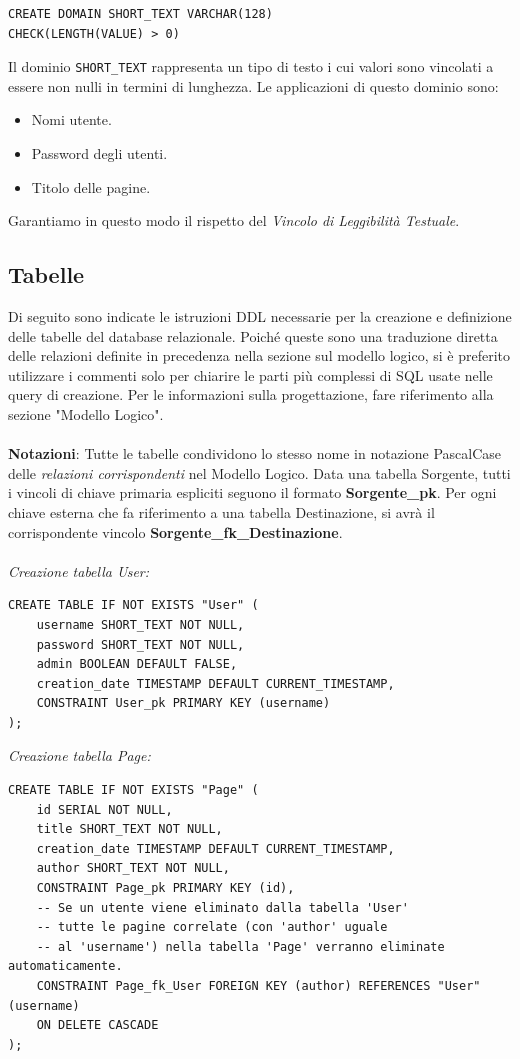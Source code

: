 \documentclass{article}
\begin{document}
	\begin{lstlisting}[style=SQL]
CREATE DOMAIN SHORT_TEXT VARCHAR(128)
CHECK(LENGTH(VALUE) > 0)
	\end{lstlisting}
Il dominio \texttt{SHORT\_TEXT} rappresenta un tipo di testo i cui valori sono vincolati
	a essere non nulli in termini di lunghezza. Le applicazioni di questo dominio sono:
	
	\begin{itemize}
		\item Nomi utente.
		\item Password degli utenti.
		\item Titolo delle pagine.
	\end{itemize}
Garantiamo in questo modo il rispetto del {\itshape{Vincolo di Leggibilit\`a Testuale}}.
	\\
	
	\subsection{Tabelle}
	Di seguito sono indicate le istruzioni DDL necessarie per la creazione e definizione delle
	tabelle del database relazionale. Poiché queste sono una traduzione diretta delle
	relazioni definite in precedenza nella sezione sul modello logico, si è preferito utilizzare i commenti solo per chiarire le parti pi\`u complessi di SQL usate nelle query di creazione.
	Per le informazioni sulla progettazione, fare riferimento alla sezione "Modello Logico".
	\\\\
	\textbf{Notazioni}: Tutte le tabelle condividono lo stesso nome in notazione PascalCase delle \textit{relazioni corrispondenti} nel Modello Logico. Data una
	tabella Sorgente, tutti i vincoli di chiave primaria espliciti seguono il formato
	\textbf{Sorgente\_pk}. Per ogni chiave esterna che fa riferimento a una tabella
	Destinazione, si avrà il corrispondente vincolo \textbf{Sorgente\_fk\_Destinazione}.
	\\\\
	
	
	\textit{Creazione tabella User:}	
	\begin{lstlisting}[style=SQL]
CREATE TABLE IF NOT EXISTS "User" (
	username SHORT_TEXT NOT NULL,
	password SHORT_TEXT NOT NULL,
	admin BOOLEAN DEFAULT FALSE,
	creation_date TIMESTAMP DEFAULT CURRENT_TIMESTAMP,
	CONSTRAINT User_pk PRIMARY KEY (username)
);
	\end{lstlisting}
	
	\textit{Creazione tabella Page:}	
	\begin{lstlisting}[style=SQL]
CREATE TABLE IF NOT EXISTS "Page" (
	id SERIAL NOT NULL,
	title SHORT_TEXT NOT NULL,
	creation_date TIMESTAMP DEFAULT CURRENT_TIMESTAMP,
	author SHORT_TEXT NOT NULL,
	CONSTRAINT Page_pk PRIMARY KEY (id),
	-- Se un utente viene eliminato dalla tabella 'User'
	-- tutte le pagine correlate (con 'author' uguale
	-- al 'username') nella tabella 'Page' verranno eliminate automaticamente.
	CONSTRAINT Page_fk_User FOREIGN KEY (author) REFERENCES "User"(username)
	ON DELETE CASCADE
);
	\end{lstlisting}
	
\end{document}
